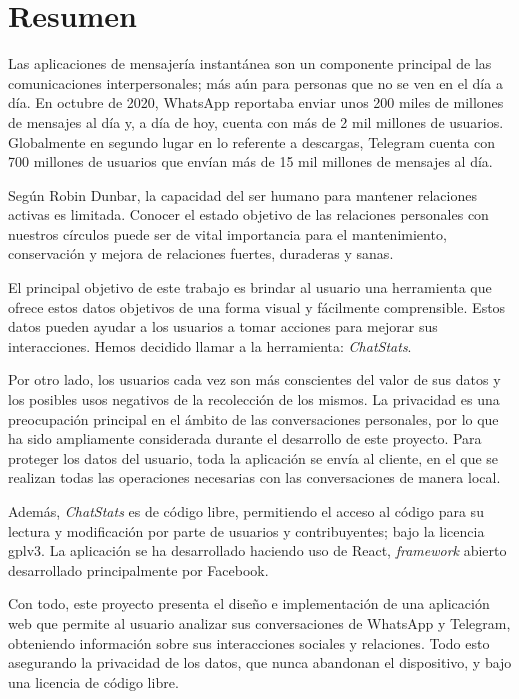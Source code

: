\cleardoublepage
{}
\chapter*{Resumen}

Las aplicaciones de mensajería instantánea son un componente principal de las comunicaciones interpersonales; más aún para personas que no se ven en el día a día. En octubre de 2020, WhatsApp reportaba enviar unos 200 miles de millones de mensajes al día \cite{whatsAppsPerDay} y, a día de hoy, cuenta con más de 2 mil millones de usuarios.\cite{whatsAppsUsers} Globalmente en segundo lugar en lo referente a descargas, Telegram cuenta con 700 millones de usuarios \cite{telegramSecondPlaceGlobally} que envían más de 15 mil millones de mensajes al día. \cite{telegramMessagesPerDay}

Según Robin Dunbar, la capacidad del ser humano para mantener relaciones activas es limitada.\cite{dunbarNumber} Conocer el estado objetivo de las relaciones personales con nuestros círculos puede ser de vital importancia para el mantenimiento, conservación y mejora de relaciones fuertes, duraderas y sanas.

El principal objetivo de este trabajo es brindar al usuario una herramienta que ofrece estos datos objetivos de una forma visual y fácilmente comprensible. Estos datos pueden ayudar a los usuarios a tomar acciones para mejorar sus interacciones. Hemos decidido llamar a la herramienta: \textit{ChatStats}.

Por otro lado, los usuarios cada vez son más conscientes del valor de sus datos y los posibles usos negativos de la recolección de los mismos. La privacidad es una preocupación principal en el ámbito de las conversaciones personales, por lo que ha sido ampliamente considerada durante el desarrollo de este proyecto. Para proteger los datos del usuario, toda la aplicación se envía al cliente, en el que se realizan todas las operaciones necesarias con las conversaciones de manera local. 

Además, \textit{ChatStats} es de código libre, permitiendo el acceso al código para su lectura y modificación por parte de usuarios y contribuyentes; bajo la licencia \acrfull{gplv3}.\cite{GPLv3} La aplicación se ha desarrollado haciendo uso de React, \textit{framework} abierto desarrollado principalmente por Facebook.

Con todo, este proyecto presenta el diseño e implementación de una aplicación web que permite al usuario analizar sus conversaciones de WhatsApp y Telegram, obteniendo información sobre sus interacciones sociales y relaciones. Todo esto asegurando la privacidad de los datos, que nunca abandonan el dispositivo, y bajo una licencia de código libre.

